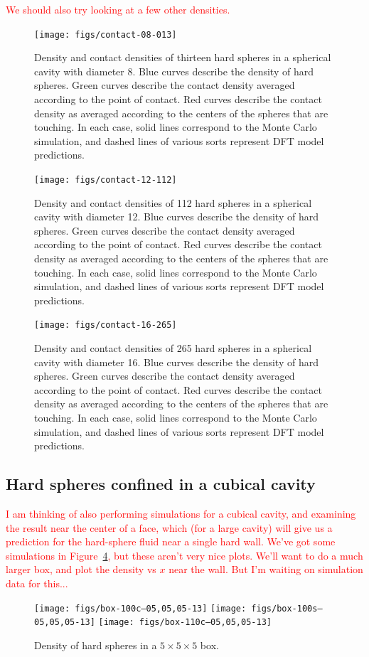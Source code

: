 \documentclass[letterpaper,twocolumn,amsmath,amssymb,prb]{revtex4-1}
\begin{document}
\textcolor{red}{We should also try looking at a few other densities.}

\newcommand\sphereExplanation{ Blue curves describe the density of
  hard spheres.  Green curves describe the contact density averaged
  according to the point of contact.  Red curves describe the contact
  density as averaged according to the centers of the spheres that are
  touching.  In each case, solid lines correspond to the Monte Carlo
  simulation, and dashed lines of various sorts represent DFT model
  predictions.  }

\begin{figure}
  \texttt{[image: figs/contact-08-013]}
  \caption{Density and contact densities of thirteen hard spheres in a
    spherical cavity with diameter 8. \sphereExplanation }
  \label{fig:sphere-8}
\end{figure}

\begin{figure}
  \texttt{[image: figs/contact-12-112]}
  \caption{Density and contact densities of 112 hard spheres in a
    spherical cavity with diameter 12.  \sphereExplanation}
  \label{fig:sphere-12}
\end{figure}

\begin{figure}
  \texttt{[image: figs/contact-16-265]}
  \caption{Density and contact densities of 265 hard spheres in a
    spherical cavity with diameter 16. \sphereExplanation}
  \label{fig:sphere-16}
\end{figure}

\subsection{Hard spheres confined in a cubical cavity}

\textcolor{red}{
  I am thinking of also performing simulations for a cubical cavity, and
  examining the result near the center of a face, which (for a large
  cavity) will give us a prediction for the hard-sphere fluid near a
  single hard wall.  We've got some simulations in
  Figure~\ref{fig:box-density}, but these aren't very nice plots.
  We'll want to do a much larger box, and plot the density vs $x$ near
  the wall.  But I'm waiting on simulation data for this...
}

\begin{figure}
\texttt{[image: figs/box-100c--05,05,05-13]}
\texttt{[image: figs/box-100s--05,05,05-13]}
\texttt{[image: figs/box-110c--05,05,05-13]}
\caption{Density of hard spheres in a $5\times5\times5$ box.}
\label{fig:box-density}
\end{figure}
\end{document}
